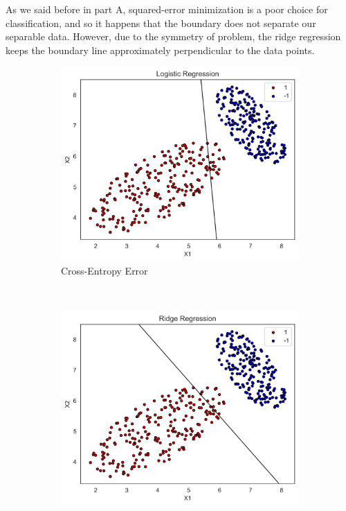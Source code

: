\documentclass[12pt]{article}
\begin{document}
\begin{enumerate}[leftmargin=*]
\begin{enumerate}[label = \Alph*.]
As we said before in part A, squared-error minimization is a poor choice for classification, and so it happens that the boundary does not separate our separable data. However, due to the symmetry of problem, the ridge regression keeps the boundary line approximately perpendicular to the data points.
\begin{figure}[h]
\centering
\begin{subfigure}[t]{0.45\textwidth}
\centering
\includegraphics[scale=0.5]{logregress.png}
\caption{Cross-Entropy Error}
\end{subfigure}
~
\begin{subfigure}[t]{0.45\textwidth}
\centering
\includegraphics[scale=0.5]{ridregress.png}

\end{subfigure}
\end{figure}
\end{enumerate}
\end{enumerate}
\end{document}
